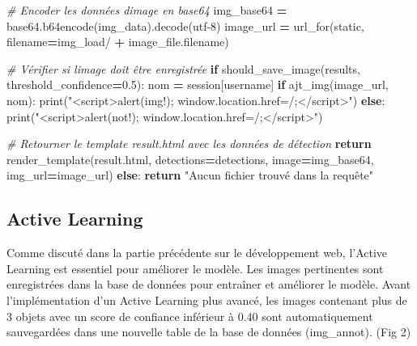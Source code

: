 \documentclass[
  10pt,
]{article}
\newenvironment{Shaded}{\begin{snugshade}}{\end{snugshade}}
\newcommand{\BuiltInTok}[1]{#1}
\newcommand{\CommentTok}[1]{\textcolor[rgb]{0.56,0.35,0.01}{\textit{#1}}}
\newcommand{\ControlFlowTok}[1]{\textcolor[rgb]{0.13,0.29,0.53}{\textbf{#1}}}
\newcommand{\FloatTok}[1]{\textcolor[rgb]{0.00,0.00,0.81}{#1}}
\newcommand{\NormalTok}[1]{#1}
\newcommand{\OperatorTok}[1]{\textcolor[rgb]{0.81,0.36,0.00}{\textbf{#1}}}
\newcommand{\StringTok}[1]{\textcolor[rgb]{0.31,0.60,0.02}{#1}}
\begin{document}
\begin{Shaded}
\begin{Highlighting}[]
            \CommentTok{\# Encoder les données d\textquotesingle{}image en base64}
\NormalTok{            img\_base64 }\OperatorTok{=}\NormalTok{ base64.b64encode(img\_data).decode(}\StringTok{\textquotesingle{}utf{-}8\textquotesingle{}}\NormalTok{)}
\NormalTok{            image\_url }\OperatorTok{=}\NormalTok{ url\_for(}\StringTok{\textquotesingle{}static\textquotesingle{}}\NormalTok{, filename}\OperatorTok{=}\StringTok{\textquotesingle{}img\_load/\textquotesingle{}} \OperatorTok{+}\NormalTok{ image\_file.filename)}

            \CommentTok{\# Vérifier si l\textquotesingle{}image doit être enregistrée}
            \ControlFlowTok{if}\NormalTok{ should\_save\_image(results, threshold\_confidence}\OperatorTok{=}\FloatTok{0.5}\NormalTok{):}
\NormalTok{                nom }\OperatorTok{=}\NormalTok{ session[}\StringTok{\textquotesingle{}username\textquotesingle{}}\NormalTok{]}
                \ControlFlowTok{if}\NormalTok{ ajt\_img(image\_url, nom):}
                    \BuiltInTok{print}\NormalTok{(}\StringTok{"\textless{}script\textgreater{}alert(\textquotesingle{}img!\textquotesingle{}); window.location.href=\textquotesingle{}/\textquotesingle{};\textless{}/script\textgreater{}"}\NormalTok{)}
                \ControlFlowTok{else}\NormalTok{:}
                    \BuiltInTok{print}\NormalTok{(}\StringTok{"\textless{}script\textgreater{}alert(\textquotesingle{}not!\textquotesingle{}); window.location.href=\textquotesingle{}/\textquotesingle{};\textless{}/script\textgreater{}"}\NormalTok{)}
            
            \CommentTok{\# Retourner le template result.html avec les données de détection}
            \ControlFlowTok{return}\NormalTok{ render\_template(}\StringTok{\textquotesingle{}result.html\textquotesingle{}}\NormalTok{, detections}\OperatorTok{=}\NormalTok{detections,}
\NormalTok{            image}\OperatorTok{=}\NormalTok{img\_base64, img\_url}\OperatorTok{=}\NormalTok{image\_url)}
        \ControlFlowTok{else}\NormalTok{:}
            \ControlFlowTok{return} \StringTok{"Aucun fichier trouvé dans la requête"}
\end{Highlighting}
\end{Shaded}

\subsection{Active Learning}\label{active-learning}

Comme discuté dans la partie précédente sur le développement web,
l'Active Learning est essentiel pour améliorer le modèle. Les images
pertinentes sont enregistrées dans la base de données pour entraîner et
améliorer le modèle. Avant l'implémentation d'un Active Learning plus
avancé, les images contenant plus de 3 objets avec un score de confiance
inférieur à 0.40 sont automatiquement sauvegardées dans une nouvelle
table de la base de données (img\_annot). (Fig 2)
\end{document}
